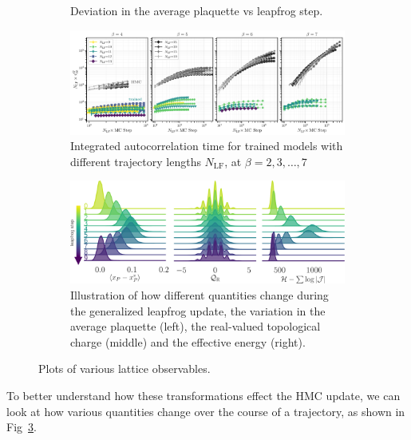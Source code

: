 \documentclass[a4paper,11pt]{article}
\begin{document}
\begin{figure}[htpb]
\begin{subfigure}[b]{0.49\textwidth}
        \caption{\label{fig:plaqsf_beta}Deviation in the average plaquette vs
        leapfrog step.}
    \end{subfigure}
    \begin{subfigure}[b]{\textwidth}
        \includegraphics[width=\textwidth]{assets/tint.pdf}
        \caption{\label{fig:tint}Integrated autocorrelation time for trained
        models with different trajectory lengths \(N_{\mathrm{LF}}\), at
    \(\beta = 2, 3, \ldots, 7\)}
    \end{subfigure}
    \begin{subfigure}[t]{\textwidth}
        \includegraphics[width=\textwidth]{assets/ridgeplots.pdf}
        \caption{\label{fig:ridgeplots}Illustration of how different quantities
            change during the generalized leapfrog update, the variation in the
            average plaquette (left), the real-valued topological charge
        (middle) and the effective energy (right).}
    \end{subfigure}
    \caption{\label{fig:observables}Plots of various lattice observables.}
\end{figure}
%
%
To better understand how these transformations effect the HMC update, we can
look at how various quantities change over the course of a trajectory, as shown
in Fig~\ref{fig:ridgeplots}.
%
\end{document}

